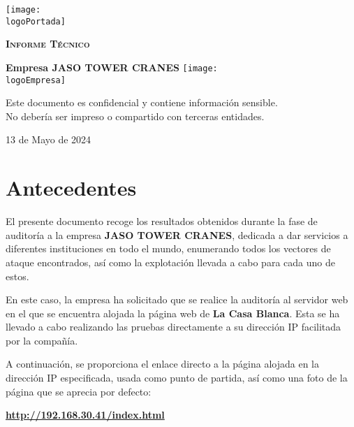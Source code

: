 \documentclass[a4paper]{article} %
\newcommand{\logoPortada}{images/vulnhub.png}
\newcommand{\companyName}{JASO TOWER CRANES}
\newcommand{\logoEmpresa}{images/jaso.png}
\newcommand{\startDate}{13 de Mayo de 2024}
\begin{document}
  \cfoot{\thepage}
  \begin{titlepage}
    \centering
    \texttt{[image: \\logoPortada]}\par\vspace{1cm}
    {\scshape\LARGE \textbf{Informe Técnico}\par\vspace{0.4cm}}
    {\Huge\textcolor{bluePortada}{\textbf{{Empresa \companyName}}}}
    \vfill
      \texttt{[image: \\logoEmpresa]}
    \vfill
    \begin{tcolorbox}[colback=red!5!white,colframe=red!75!black]
      \centering
        Este documento es confidencial y contiene información sensible.
        \\No debería ser impreso o compartido con terceras entidades.
    \end{tcolorbox}

    \vfill
      {\large \startDate}
    \vfill
  \end{titlepage}

  \clearpage
  \tableofcontents
  \clearpage
  \section{Antecedentes}
  El presente documento recoge los resultados obtenidos durante la fase de auditoría a la empresa \textbf{\companyName}, dedicada a dar servicios a diferentes instituciones en todo el mundo, enumerando todos los vectores de ataque encontrados, así como la explotación llevada a cabo para cada uno de estos.

  En este caso, la empresa ha solicitado que se realice la auditoría al servidor web en el que se encuentra alojada la página web de \textbf{La Casa Blanca}. Esta se ha llevado a cabo realizando las pruebas directamente a su dirección IP facilitada por la compañía.

  A continuación, se proporciona el enlace directo a la página alojada en la dirección IP especificada, usada como punto de partida, así como una foto de la página que se aprecia por defecto:

  \begin{tcolorbox}[enhanced,attach boxed title to top center={yshift=-3mm,yshifttext=-1mm},
  colback=blue!5!white,colframe=blue!75!black,colbacktitle=bluePortada!80!black,
  title=Dirección URL,fonttitle=\bfseries,
  boxed title style={size=small,colframe=bluePortada!50!black} ]
  \centering
    \href{https://www.vulnhub.com/entry/presidential-1,500/}{\textbf{\color{bluePortada}http://192.168.30.41/index.html}}
  \end{tcolorbox}
\end{document}
